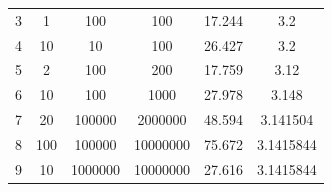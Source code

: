 \documentclass{article}
\begin{document}
\begin{table}[htbp]
\begin{tabular}{cccccc}
3                   & 1                                                                 & 100                                                                  & 100                                                                    & 17.244                                                             & 3.2                                                             \\
4                   & 10                                                                & 10                                                                   & 100                                                                    & 26.427                                                             & 3.2                                                             \\
5                   & 2                                                                 & 100                                                                  & 200                                                                    & 17.759                                                             & 3.12                                                            \\
6                   & 10                                                                & 100                                                                  & 1000                                                                   & 27.978                                                             & 3.148                                                           \\
7                   & 20                                                                & 100000                                                               & 2000000                                                                & 48.594                                                             & 3.141504                                                        \\
8                   & 100                                                               & 100000                                                               & 10000000                                                               & 75.672                                                             & 3.1415844                                                       \\
9                   & 10                                                                & 1000000                                                              & 10000000                                                               & 27.616                                                             & 3.1415844                                                       \\

\end{tabular}
\end{table}
\end{document}
